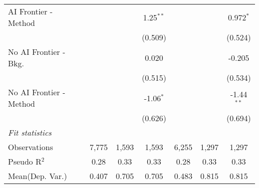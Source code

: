 \begin{tabular}{lcccccc}
   AI Frontier - Method    &                &              & 1.25$^{**}$ &                &             & 0.972$^{*}$\\   
                           &                &              & (0.509)     &                &             & (0.524)\\   
   No AI Frontier - Bkg.   &                &              & 0.020       &                &             & -0.205\\   
                           &                &              & (0.515)     &                &             & (0.534)\\   
   No AI Frontier - Method &                &              & -1.06$^{*}$ &                &             & -1.44$^{**}$\\   
                           &                &              & (0.626)     &                &             & (0.694)\\   
   \midrule
   \emph{Fit statistics}\\
   Observations            & 7,775          & 1,593        & 1,593       & 6,255          & 1,297       & 1,297\\  
   Pseudo R$^2$            & 0.28           & 0.33         & 0.33        & 0.28           & 0.33        & 0.33\\  
Mean(Dep. Var.) & 0.407 & 0.705 & 0.705 & 0.483 & 0.815 & 0.815 \\
   

\end{tabular}
